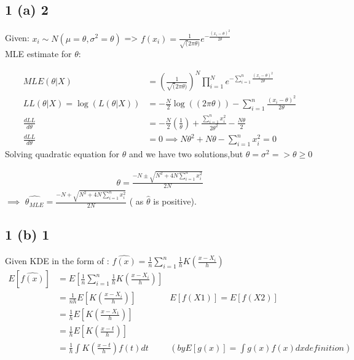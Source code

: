\documentclass[10pt,letterpaper]{article}
\begin{document}
\subsection{1 (a) 2}
Given: $x_i \sim N(\mu=\theta, \sigma^2=\theta)$  =>  $f(x_i)= \frac{1}{\sqrt(2\pi \theta)} e^{-\frac{(x_i-\theta)^2}{2\theta}}$\\MLE estimate for $\theta$:

\begin{align*}
MLE(\theta|X) &= ( \frac{1}{\sqrt(2\pi \theta)})^N\prod_{i=1}^N e^{-\sum_{i=1}^n\frac{(x_i-\theta)^2}{2\theta}}\\
LL(\theta|X)=\log(L(\theta|X)) &= -\frac{N}{2} \log((2\pi \theta)) -\sum_{i=1}^n\frac{(x_i-\theta)^2}{2\theta} \\
\frac{dLL}{d\theta} &= -\frac{N}{2}(\frac{1}{\theta})+\frac{\sum_{i=1}^n x_i^2}{2\theta^2}-\frac{N\theta}{2}\\
\frac{dLL}{d\theta} &=0 \implies N\theta^2+N\theta-\sum_{i=1}^n x_i^2 =0
\end{align*}
Solving quadratic equation for $\theta$ and we have two solutions,but $\theta =\sigma^2 => \theta \geq 0$ 

\begin{align*}
\theta = \frac{-N\pm \sqrt{N^2+4N\sum_{i=1}^nx_i^2}}{2N}
\end{align*}
 $\implies$ ${\hat{\theta_{MLE}} = \frac{-N + \sqrt{N^2+4N\sum_{i=1}^nx_i^2}}{2N}} $ ( as $\hat{\theta} $ is positive). 
\subsection{1 (b) 1}
Given KDE in the form of : $\hat{f(x)}=\frac{1}{n}\sum_{i=1}^n \frac{1}{h}K(\frac{x-X_i}{h})$
\begin{align*}
E[\hat{f(x)}] &= E[\frac{1}{n}\sum_{i=1}^n \frac{1}{h}K(\frac{x-X_i}{h})]\\
&=\frac{1}{nh}E[K(\frac{x-X_i}{h})]  &E[f(X1)] =E[f(X2)]\\
&=\frac{1}{h}E[K(\frac{x-X_1}{h})] \\
&=\frac{1}{h}E[K(\frac{x-t}{h})]\\
&=\frac{1}{h}\int K(\frac{x-t}{h}) f(t)dt & (by E[g(x)]=\int g(x)f(x)dx definition)\\ 
\end{align*}
\end{document}
